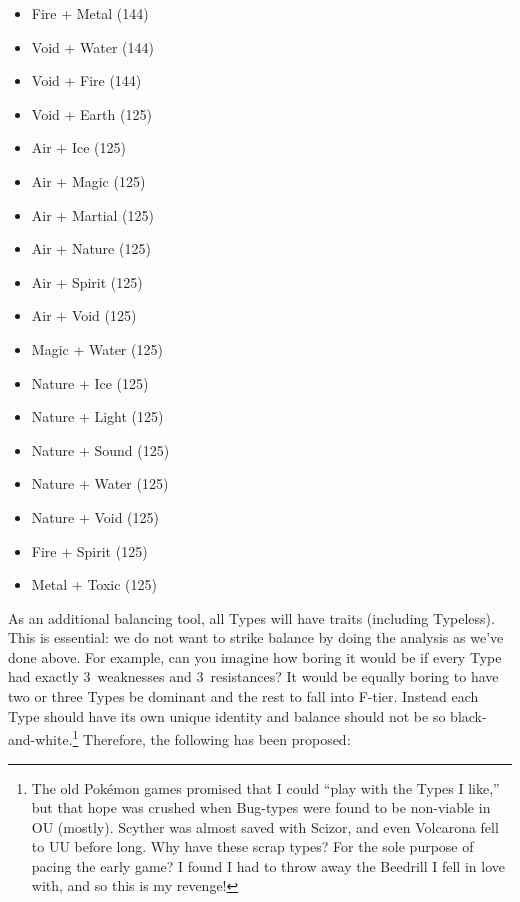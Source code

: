 \begin{itemize}
	\item{Fire + Metal (144)}
	\item{Void + Water (144)}
	\item{Void + Fire (144)}


	
	\item{Void + Earth (125)}	

	\item{Air + Ice (125)}	
	\item{Air + Magic (125)}
	\item{Air + Martial (125)}
	\item{Air + Nature (125)}
	\item{Air + Spirit (125)}
	\item{Air + Void (125)}
		
	\item{Magic + Water (125)}

	\item{Nature + Ice (125)}
	\item{Nature + Light (125)}
	\item{Nature + Sound (125)}
	\item{Nature + Water (125)}
	\item{Nature + Void (125)}	

	
	\item{Fire + Spirit (125)}

	\item{Metal + Toxic (125)}


\end{itemize}

\newpage


As an additional balancing tool, all Types will have traits (including Typeless). This is essential: we do not want to strike balance by doing the analysis as we've done above. For example, can you imagine how boring it would be if every Type had exactly 3~weaknesses and 3~resistances? It would be equally boring to have two or three Types be dominant and the rest to fall into F-tier. Instead each Type should have its own unique identity and balance should not be so black-and-white.\footnote{The old Pok\'{e}mon games promised that I could ``play with the Types I like,'' but that hope was crushed when Bug-types were found to be non-viable in OU (mostly). Scyther was almost saved with Scizor, and even Volcarona fell to UU before long. Why have these scrap types? For the sole purpose of pacing the early game? I found I had to throw away the Beedrill I fell in love with, and so this is my revenge!} Therefore, the following has been proposed:

